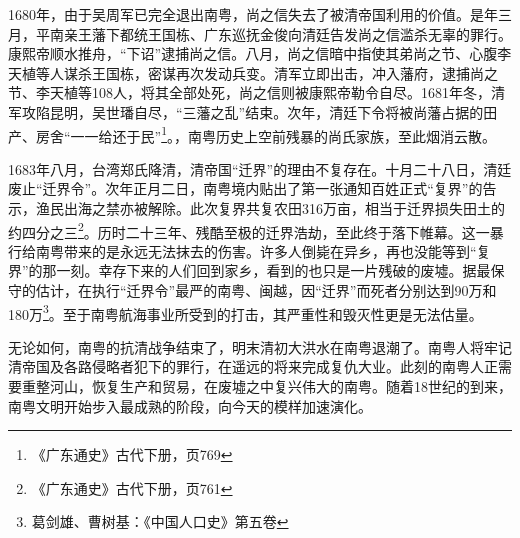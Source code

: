 1680年，由于吴周军已完全退出南粤，尚之信失去了被清帝国利用的价值。是年三月，平南亲王藩下都统王国栋、广东巡抚金俊向清廷告发尚之信滥杀无辜的罪行。康熙帝顺水推舟，“下诏”逮捕尚之信。八月，尚之信暗中指使其弟尚之节、心腹李天植等人谋杀王国栋，密谋再次发动兵变。清军立即出击，冲入藩府，逮捕尚之节、李天植等108人，将其全部处死，尚之信则被康熙帝勒令自尽。1681年冬，清军攻陷昆明，吴世璠自尽，“三藩之乱”结束。次年，清廷下令将被尚藩占据的田产、房舍“一一给还于民”\footnote{《广东通史》古代下册，页769}。，南粤历史上空前残暴的尚氏家族，至此烟消云散。

1683年八月，台湾郑氏降清，清帝国“迁界”的理由不复存在。十月二十八日，清廷废止“迁界令”。次年正月二日，南粤境内贴出了第一张通知百姓正式“复界”的告示，渔民出海之禁亦被解除。此次复界共复农田316万亩，相当于迁界损失田土的约四分之三\footnote{《广东通史》古代下册，页761}。历时二十三年、残酷至极的迁界浩劫，至此终于落下帷幕。这一暴行给南粤带来的是永远无法抹去的伤害。许多人倒毙在异乡，再也没能等到“复界”的那一刻。幸存下来的人们回到家乡，看到的也只是一片残破的废墟。据最保守的估计，在执行“迁界令”最严的南粤、闽越，因“迁界”而死者分别达到90万和180万\footnote{葛剑雄、曹树基：《中国人口史》第五卷}。至于南粤航海事业所受到的打击，其严重性和毁灭性更是无法估量。

无论如何，南粤的抗清战争结束了，明末清初大洪水在南粤退潮了。南粤人将牢记清帝国及各路侵略者犯下的罪行，在遥远的将来完成复仇大业。此刻的南粤人正需要重整河山，恢复生产和贸易，在废墟之中复兴伟大的南粤。随着18世纪的到来，南粤文明开始步入最成熟的阶段，向今天的模样加速演化。






